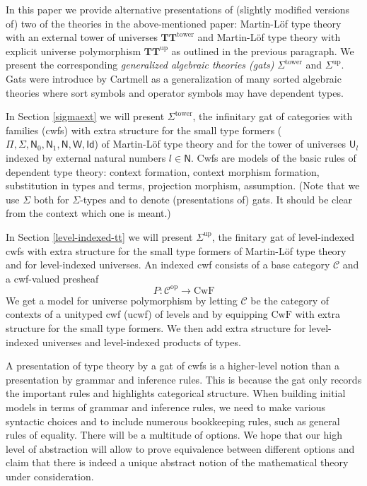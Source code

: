 \documentclass[submission,copyright,creativecommons]{eptcs}
\newcommand{\Id}{\mathsf{Id}}
\newcommand{\NN}{\mathsf{N}}
\newcommand{\op}{\mathrm{op}}
\def\NN{\mathsf{N}}
\newcommand{\N}{\mathsf{N}}
\def\U{\mathsf{U}}
\def\CwF{\mathrm{CwF}}
\def\C{\mathcal{C}}
\def\W{\mathsf{W}}
\def\Sigmaext{{\Sigma^\mathrm{tower}}}
\def\Sigmaint{{\Sigma^\mathrm{up}}}
\def\TText{{\mathbf{TT}^\mathrm{tower}}}
\def\TTint{{\mathbf{TT}^\mathrm{up}}}
\begin{document}
In this paper we provide alternative presentations of (slightly modified versions of) two of the theories in the above-mentioned paper: Martin-Löf type theory with an external tower of universes $\TText$ and Martin-Löf type theory with explicit universe polymorphism $\TTint$ as outlined in the previous paragraph. We present the corresponding {\em generalized algebraic theories (gats)} $\Sigmaext$ and $\Sigmaint$. Gats were introduce by Cartmell \cite{cartmell:phd,cartmell:apal} as a generalization of many sorted algebraic theories where sort symbols and operator symbols may have dependent types.

In Section \ref{sigmaext} we will present $\Sigmaext$, the infinitary gat of categories with families (cwfs)  \cite{dybjer:torino} with extra structure for the small type formers ($\Pi, \Sigma, \N_0, \N_1, \N, \W, \Id$) of Martin-Löf type theory and for the tower of universes $\U_l$ indexed by external natural numbers $l \in \NN$. Cwfs are models of the basic rules of dependent type theory: context formation, context morphism formation, substitution in types and terms, projection morphism, assumption.  (Note that we use $\Sigma$ both for $\Sigma$-types and to denote (presentations of) gats. It should be clear from the context which one is meant.)

In Section \ref{level-indexed-tt} we will present $\Sigmaint$, the finitary gat of level-indexed cwfs with extra structure for the small type formers of Martin-Löf type theory and for level-indexed universes. An indexed cwf consists of a base category $\C$ and a cwf-valued presheaf
$$
P : \C^\op \to \CwF
$$
We get a model for universe polymorphism by letting $\C$ be the category of contexts of a unityped cwf (ucwf) of levels and by equipping $\CwF$ with extra structure for the small type formers. We then
add extra structure for level-indexed universes and level-indexed products of types.

A presentation of type theory by a gat of cwfs is a higher-level
notion than a presentation by grammar and inference rules. This is because the gat only records the important rules and highlights categorical structure. When building initial models in terms of grammar and inference rules, we need to make various syntactic choices and to include numerous bookkeeping rules, such as general rules of equality. There will be a multitude of options. We hope that our high level of abstraction will allow to prove equivalence between different options and claim that there is indeed a unique abstract notion of the mathematical theory under consideration.
\end{document}
